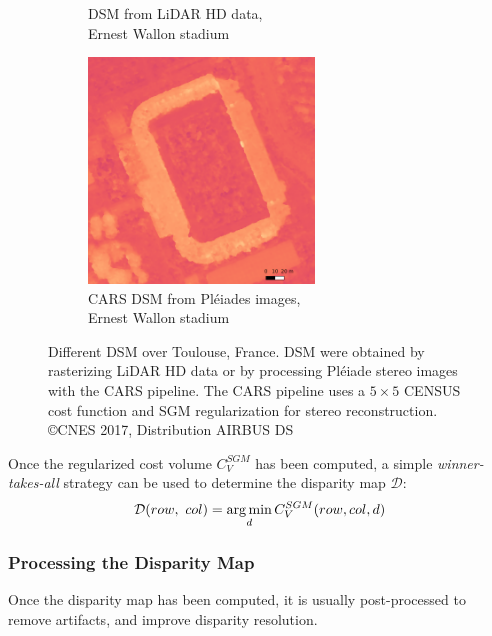 \begin{figure}
\begin{subfigure}[t]{0.5\linewidth}
        \caption{DSM from LiDAR HD data,\\Ernest Wallon stadium}
        \label{fig:DSM_ernest_wallon_lidar}
    \end{subfigure}\hfill
    \begin{subfigure}[t]{0.5\linewidth}
        \centering
        \includegraphics[height=6cm]{Images/Chap_1/DSM_Wallon_CARS.png}
        \caption{CARS DSM from Pléiades images,\\Ernest Wallon stadium}
        \label{fig:DSM_ernest_wallon_cars}
    \end{subfigure}
    \caption{Different DSM over Toulouse, France. DSM were obtained by rasterizing LiDAR HD data or by processing Pléiade stereo images with the CARS pipeline. The CARS pipeline uses a $5\times5$ CENSUS cost function and SGM regularization for stereo reconstruction. \copyright CNES 2017, Distribution AIRBUS DS}
    \label{fig:DSM_toulouse}
\end{figure}


Once the regularized cost volume $C_V^{SGM}$ has been computed, a simple \textit{winner-takes-all} strategy can be used to determine the disparity map $\mathcal{D}$:
\begin{align}
    \mathcal{D}(row, ~col) = \operatorname*{arg\,min}_d C_V^{SGM}(row, col, d) 
\end{align}

\subsubsection{Processing the Disparity Map}\label{sec:postprocess_disparity}
Once the disparity map has been computed, it is usually post-processed to remove artifacts, and improve disparity resolution.

